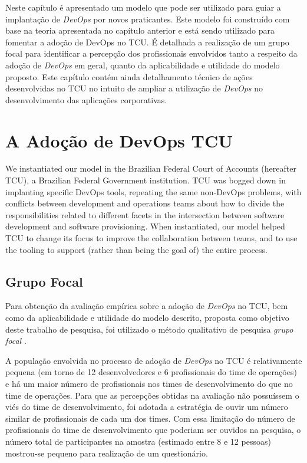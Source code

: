 Neste capítulo é apresentado um modelo que pode ser utilizado para guiar a
implantação de \textit{DevOps} por novos praticantes. Este modelo foi construído
com base na teoria apresentada no capítulo anterior e está sendo
utilizado para fomentar a adoção de DevOps no \acrshort{TCU}. É detalhada a
realização de um grupo focal \cite{focus_group_handbook,shull2007guide} para
identificar a percepção dos profissionais envolvidos tanto a respeito da adoção
de {\it DevOps} em geral, quanto da aplicabilidade e utilidade do modelo proposto.
Este capítulo contém ainda detalhamento técnico de ações desenvolvidas no
\acrshort{TCU} no intuito de ampliar a utilização de {\it DevOps} no
desenvolvimento das aplicações corporativas.

\section{A Adoção de DevOps \acrshort{TCU}}
We instantiated our model in the Brazilian Federal Court of Accounts (hereafter TCU), a Brazilian Federal
Government institution. TCU was bogged down in implanting specific DevOps tools, repeating the same non-DevOps problems, with
conflicts between development and operations teams about how to divide the responsibilities related to different facets in the intersection between software development and software provisioning.
When instantiated, our model helped TCU to change its focus to
improve the collaboration between teams, and to use the tooling
to support (rather than being the goal of) the entire process.

\subsection{Grupo Focal}

Para obtenção da avaliação empírica sobre a adoção de {\it DevOps} no \acrshort{TCU},
bem como da aplicabilidade e utilidade do modelo descrito,
proposta como objetivo deste trabalho de pesquisa, foi utilizado o método qualitativo
de pesquisa \emph{grupo focal} \cite{focus_group_handbook}.

A população envolvida no processo de adoção de \textit{DevOps} no TCU é
relativamente pequena (em torno de 12 desenvolvedores e 6 profissionais do time
de operações) e há um maior número de profissionais nos times de
desenvolvimento do que no time de operações. Para que as percepções obtidas
na avaliação não possuíssem o viés do time de desenvolvimento, foi adotada a
estratégia de ouvir um número similar de profissionais de cada um dos times.
Com essa limitação do número de profissionais do time de desenvolvimento que
poderiam ser ouvidos na pesquisa, o número total de participantes na amostra
(estimado entre 8 e 12 pessoas) mostrou-se pequeno para realização de um
questionário.

